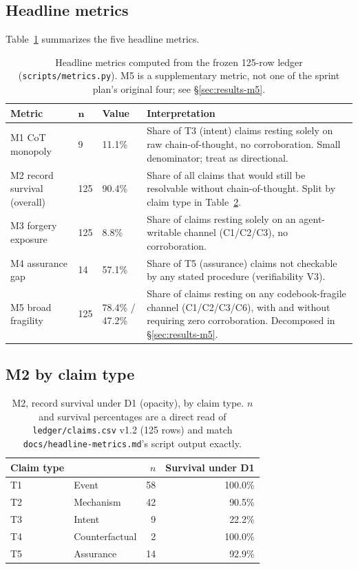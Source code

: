 \documentclass[10pt]{article}
\begin{document}
\subsection{Headline metrics}
\label{sec:results-headline}

Table~\ref{tab:headline-metrics} summarizes the five headline metrics.

\begin{table}[h]
\centering
\small
\caption{Headline metrics computed from the frozen 125-row ledger
(\texttt{scripts/metrics.py}). M5 is a supplementary metric, not one of the
sprint plan's original four; see \S\ref{sec:results-m5}.}
\label{tab:headline-metrics}
\begin{tabular}{@{}p{2.6cm}p{1cm}p{2cm}p{8.4cm}@{}}
\toprule
\textbf{Metric} & $\mathbf{n}$ & \textbf{Value} & \textbf{Interpretation} \\
\midrule
M1 CoT monopoly & 9 & 11.1\% & Share of T3 (intent) claims resting solely on
raw chain-of-thought, no corroboration. Small denominator; treat as
directional. \\
M2 record survival (overall) & 125 & 90.4\% & Share of all claims that would
still be resolvable without chain-of-thought. Split by claim type in
Table~\ref{tab:m2-by-type}. \\
M3 forgery exposure & 125 & 8.8\% & Share of claims resting solely on an
agent-writable channel (C1/C2/C3), no corroboration. \\
M4 assurance gap & 14 & 57.1\% & Share of T5 (assurance) claims not checkable
by any stated procedure (verifiability V3). \\
M5 broad fragility & 125 & 78.4\% / 47.2\% & Share of claims resting on any
codebook-fragile channel (C1/C2/C3/C6), with and without requiring zero
corroboration. Decomposed in \S\ref{sec:results-m5}. \\
\bottomrule
\end{tabular}
\end{table}

\subsection{M2 by claim type}
\label{sec:results-m2}

\begin{table}[h]
\centering
\caption{M2, record survival under D1 (opacity), by claim type. $n$ and
survival percentages are a direct read of \texttt{ledger/claims.csv} v1.2
(125 rows) and match \texttt{docs/headline-metrics.md}'s script output
exactly.}
\label{tab:m2-by-type}
\begin{tabular}{@{}llrr@{}}
\toprule
Claim type & & $n$ & Survival under D1 \\
\midrule
T1 & Event          & 58 & 100.0\% \\
T2 & Mechanism      & 42 & 90.5\%  \\
T3 & Intent         & 9  & 22.2\%  \\
T4 & Counterfactual & 2  & 100.0\% \\
T5 & Assurance      & 14 & 92.9\%  \\
\bottomrule
\end{tabular}
\end{table}
\end{document}
